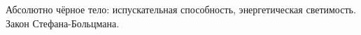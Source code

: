 \documentclass[__main__.tex]{subfiles}
\begin{document}
Абсолютно чёрное тело: испускательная способность, энергетическая светимость. Закон Стефана-Больцмана.\\ 

\end{document}
